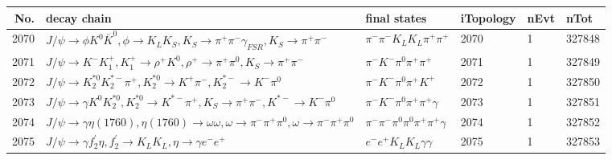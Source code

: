 \begin{table}[htbp] 
\begin{center}
\begin{small}
\begin{tabular}{rlllll}\hline\hline
 No. & decay chain & final states &  iTopology & nEvt & nTot \\\hline
2070&$J/\psi       \rightarrow \phi           K^{0}          \bar{K}^{0}   , \phi            \rightarrow K_{L}          K_{S}          , K_{S}           \rightarrow \pi^{+}        \pi^{-}        \gamma_{FSR} , K_{S}           \rightarrow \pi^{+}        \pi^{-}        $&$\pi^{-}        \pi^{-}        K_{L}          K_{L}          \pi^{+}        \pi^{+}        $& 2070&    1&327848\\
2071&$J/\psi       \rightarrow K^{-}          K_1^{+}        , K_1^{+}         \rightarrow \rho^{+}      K^{0}          , \rho^{+}       \rightarrow \pi^{+}        \pi^{0}        , K_{S}           \rightarrow \pi^{+}        \pi^{-}        $&$\pi^{-}        K^{-}          \pi^{0}        \pi^{+}        \pi^{+}        $& 2071&    1&327849\\
2072&$J/\psi       \rightarrow K_2^{*0}       K_2^{*-}       \pi^{+}        , K_2^{*0}        \rightarrow K^{+}          \pi^{-}        , K_2^{*-}        \rightarrow K^{-}          \pi^{0}        $&$\pi^{-}        K^{-}          \pi^{0}        \pi^{+}        K^{+}          $& 2072&    1&327850\\
2073&$J/\psi       \rightarrow \gamma       K^{0}          K_2^{*0}       , K_2^{*0}        \rightarrow K^{*-}         \pi^{+}        , K_{S}           \rightarrow \pi^{+}        \pi^{-}        , K^{*-}          \rightarrow K^{-}          \pi^{0}        $&$\pi^{-}        K^{-}          \pi^{0}        \pi^{+}        \pi^{+}        \gamma       $& 2073&    1&327851\\
2074&$J/\psi       \rightarrow \gamma       \eta(1760)    , \eta(1760)     \rightarrow \omega         \omega         , \omega          \rightarrow \pi^{-}        \pi^{+}        \pi^{0}        , \omega          \rightarrow \pi^{-}        \pi^{+}        \pi^{0}        $&$\pi^{-}        \pi^{-}        \pi^{0}        \pi^{0}        \pi^{+}        \pi^{+}        \gamma       $& 2074&    1&327852\\
2075&$J/\psi       \rightarrow \gamma       f_2^{'}       \eta          , f_2^{'}        \rightarrow K_{L}          K_{L}          , \eta           \rightarrow \gamma       e^{-}        e^{+}        $&$e^{-}        e^{+}        K_{L}          K_{L}          \gamma       \gamma       $& 2075&    1&327853\\

\end{tabular}
\end{small}
\end{center}
\end{table}
